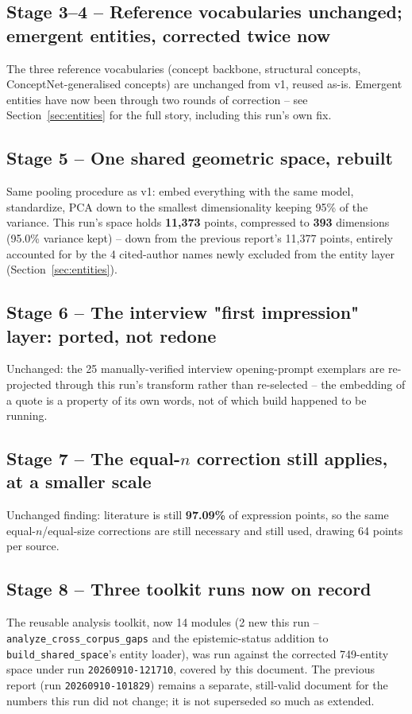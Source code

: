 \documentclass[11pt,a4paper]{article}
\begin{document}
\subsection{Stage 3--4 -- Reference vocabularies unchanged; emergent entities, corrected twice now}
The three reference vocabularies (concept backbone, structural concepts,
ConceptNet-generalised concepts) are unchanged from v1, reused as-is.
Emergent entities have now been through two rounds of correction --
see Section~\ref{sec:entities} for the full story, including this run's
own fix.

\subsection{Stage 5 -- One shared geometric space, rebuilt}
Same pooling procedure as v1: embed everything with the same model,
standardize, PCA down to the smallest dimensionality keeping 95\% of the
variance. This run's space holds \textbf{11{,}373} points, compressed to
\textbf{393} dimensions (95.0\% variance kept) -- down from the previous
report's 11{,}377 points, entirely accounted for by the 4 cited-author
names newly excluded from the entity layer (Section~\ref{sec:entities}).

\subsection{Stage 6 -- The interview "first impression" layer: ported, not redone}
Unchanged: the 25 manually-verified interview opening-prompt exemplars
are re-projected through this run's transform rather than re-selected --
the embedding of a quote is a property of its own words, not of which
build happened to be running.

\subsection{Stage 7 -- The equal-$n$ correction still applies, at a smaller scale}
Unchanged finding: literature is still \textbf{97.09\%} of expression
points, so the same equal-$n$/equal-size corrections are still necessary
and still used, drawing 64 points per source.

\subsection{Stage 8 -- Three toolkit runs now on record}
The reusable analysis toolkit, now 14 modules (2 new this run --
\texttt{analyze\_cross\_corpus\_gaps} and the epistemic-status addition
to \texttt{build\_shared\_space}'s entity loader), was run against the
corrected 749-entity space under run \texttt{20260910-121710}, covered
by this document. The previous report (run \texttt{20260910-101829})
remains a separate, still-valid document for the numbers this run did
not change; it is not superseded so much as extended.
\end{document}

